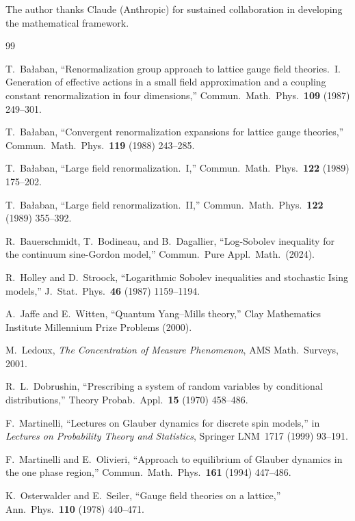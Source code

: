 \documentclass[11pt,a4paper]{article}
\theoremstyle{plain}
\theoremstyle{definition}
\theoremstyle{remark}
\begin{document}
The author thanks Claude (Anthropic) for sustained
collaboration in developing the mathematical framework.

\begin{thebibliography}{99}

 T.~Ba{\l}aban, ``Renormalization group
  approach to lattice gauge field theories.~I.
  Generation of effective actions in a small field
  approximation and a coupling constant renormalization
  in four dimensions,''
  Commun.\ Math.\ Phys.\ \textbf{109} (1987) 249--301.

 T.~Ba{\l}aban, ``Convergent
  renormalization expansions for lattice gauge theories,''
  Commun.\ Math.\ Phys.\ \textbf{119} (1988) 243--285.

 T.~Ba{\l}aban, ``Large field
  renormalization.~I,''
  Commun.\ Math.\ Phys.\ \textbf{122} (1989) 175--202.

 T.~Ba{\l}aban, ``Large field
  renormalization.~II,''
  Commun.\ Math.\ Phys.\ \textbf{122} (1989) 355--392.

 R.~Bauerschmidt, T.~Bodineau, and
  B.~Dagallier, ``Log-Sobolev inequality for the
  continuum sine-Gordon model,''
  Commun.\ Pure Appl.\ Math.\ (2024).

 R.~Holley and D.~Stroock,
  ``Logarithmic Sobolev inequalities and stochastic
  Ising models,''
  J.~Stat.\ Phys.\ \textbf{46} (1987) 1159--1194.

 A.~Jaffe and E.~Witten, ``Quantum
  Yang--Mills theory,'' Clay Mathematics Institute
  Millennium Prize Problems (2000).

 M.~Ledoux, \emph{The Concentration of
  Measure Phenomenon}, AMS Math.\ Surveys, 2001.

 R.~L.~Dobrushin, ``Prescribing a system
  of random variables by conditional distributions,''
  Theory Probab.\ Appl.\ \textbf{15} (1970) 458--486.

 F.~Martinelli, ``Lectures on Glauber
  dynamics for discrete spin models,'' in
  \emph{Lectures on Probability Theory and Statistics},
  Springer LNM~1717 (1999) 93--191.

 F.~Martinelli and E.~Olivieri,
  ``Approach to equilibrium of Glauber dynamics in the one
  phase region,'' Commun.\ Math.\ Phys.\ \textbf{161}
  (1994) 447--486.

 K.~Osterwalder and E.~Seiler, ``Gauge
  field theories on a lattice,''
  Ann.\ Phys.\ \textbf{110} (1978) 440--471.

\end{thebibliography}
\end{document}
